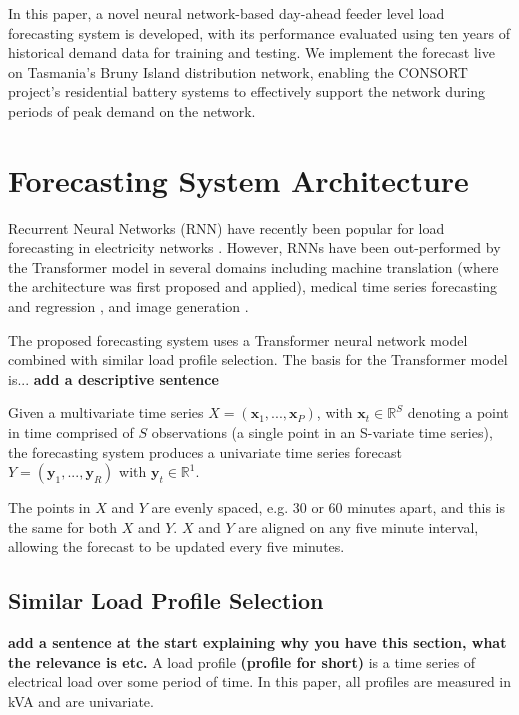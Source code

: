 \documentclass[conference]{IEEEtran}
\begin{document}
In this paper, a novel neural network-based day-ahead feeder level load forecasting system is developed, with its performance evaluated using ten years of historical demand data for training and testing. We implement the forecast live on Tasmania's Bruny Island distribution network, enabling the CONSORT project's residential battery systems to effectively support the network during periods of peak demand on the network.

\section{Forecasting System Architecture}
Recurrent Neural Networks (RNN) have recently been popular for load forecasting in electricity networks \cite{Kong2018}.
However, RNNs have been out-performed by the Transformer \cite{Vaswani2017} model in several domains including machine translation \cite{Vaswani2017} (where the architecture was first proposed and applied), medical time series forecasting and regression \cite{Song2017}, and image generation \cite{Parmar2018}.
\par
The proposed forecasting system uses a Transformer neural network model combined with similar load profile selection.
The basis for the Transformer model is... \textbf{add a descriptive sentence}
\par
Given a multivariate time series $X = (\boldsymbol{x}_1, ..., \boldsymbol{x}_P)$, with $\boldsymbol{x}_t \in \mathbb{R}^S$ denoting a point in time comprised of $S$ observations (a single point in an S-variate time series), the forecasting system produces a univariate time series forecast $Y = (\boldsymbol{y}_1, ..., \boldsymbol{y}_R)$ with $\boldsymbol{y}_t \in \mathbb{R}^1$.
\par
The points in $X$ and $Y$ are evenly spaced, e.g. 30 or 60 minutes apart, and this is the same for both $X$ and $Y$.
$X$ and $Y$ are aligned on any five minute interval, allowing the forecast to be updated every five minutes.


\subsection{Similar Load Profile Selection}
\textbf{add a sentence at the start explaining why you have this section, what the relevance is etc.}
A load profile \textbf{(profile for short)} is a time series of electrical load over some period of time.
In this paper, all profiles are measured in kVA and are univariate. 
\end{document}

